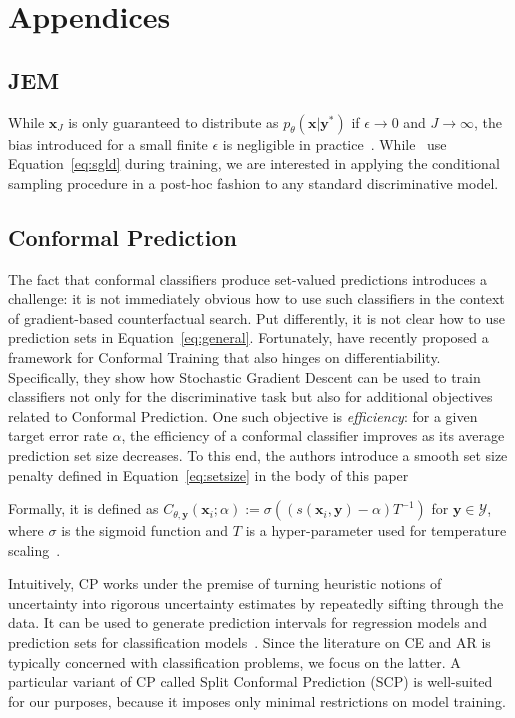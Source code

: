 \documentclass{article}
\begin{document}
\appendix
\section*{Appendices}
\renewcommand{\thesubsection}{\Alph{subsection}}

\subsection{JEM}\label{app-jem}

While $\mathbf{x}_J$ is only guaranteed to distribute as $p_{\theta}(\mathbf{x}|\mathbf{y}^*)$ if $\epsilon \rightarrow 0$ and $J \rightarrow \infty$, the bias introduced for a small finite $\epsilon$ is negligible in practice~\citep{murphy2023probabilistic,grathwohl2020your}. While~\citet{grathwohl2020your} use Equation~\ref{eq:sgld} during training, we are interested in applying the conditional sampling procedure in a post-hoc fashion to any standard discriminative model. 

\subsection{Conformal Prediction}\label{app-cp}

The fact that conformal classifiers produce set-valued predictions introduces a challenge: it is not immediately obvious how to use such classifiers in the context of gradient-based counterfactual search. Put differently, it is not clear how to use prediction sets in Equation~\ref{eq:general}. Fortunately, \citet{stutz2022learning} have recently proposed a framework for Conformal Training that also hinges on differentiability. Specifically, they show how Stochastic Gradient Descent can be used to train classifiers not only for the discriminative task but also for additional objectives related to Conformal Prediction. One such objective is \textit{efficiency}: for a given target error rate $\alpha$, the efficiency of a conformal classifier improves as its average prediction set size decreases. To this end, the authors introduce a smooth set size penalty defined in Equation~\ref{eq:setsize} in the body of this paper

Formally, it is defined as $C_{\theta,\mathbf{y}}(\mathbf{x}_i;\alpha):=\sigma\left((s(\mathbf{x}_i,\mathbf{y})-\alpha) T^{-1}\right)$ for $\mathbf{y}\in\mathcal{Y}$, where $\sigma$ is the sigmoid function and $T$ is a hyper-parameter used for temperature scaling~\citep{stutz2022learning}.

Intuitively, CP works under the premise of turning heuristic notions of uncertainty into rigorous uncertainty estimates by repeatedly sifting through the data. It can be used to generate prediction intervals for regression models and prediction sets for classification models~\citep{altmeyer2022conformal}. Since the literature on CE and AR is typically concerned with classification problems, we focus on the latter. A particular variant of CP called Split Conformal Prediction (SCP) is well-suited for our purposes, because it imposes only minimal restrictions on model training. 
\end{document}
